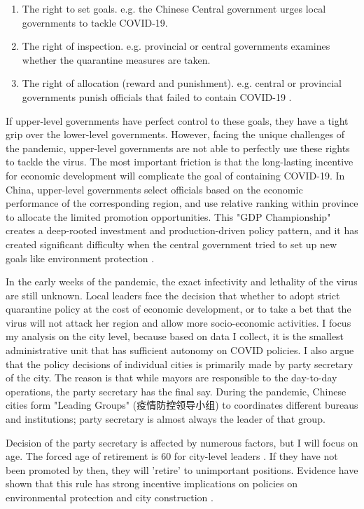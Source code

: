 \documentclass{article}
\begin{document}
\begin{CJK}{UTF8}{gbsn}
\begin{enumerate}
  \item The right to set goals. e.g. the Chinese Central government urges local governments to tackle COVID-19.
  \item The right of inspection. e.g. provincial or central governments examines whether the quarantine measures are taken. 
  \item The right of allocation (reward and punishment). e.g. central or provincial governments punish officials that failed to contain COVID-19 \cite{chezhi}.
\end{enumerate}

If upper-level governments have perfect control to these goals, they have a tight grip over the lower-level governments. 
However, facing the unique challenges of the pandemic, upper-level governments are not able to perfectly use these rights to tackle the virus. The most important friction is that the long-lasting incentive for economic development will complicate the goal of containing COVID-19. In China, upper-level governments select officials based on the  economic performance of the corresponding region, and use relative ranking within province to allocate the limited promotion opportunities. This "GDP Championship" creates a deep-rooted investment and production-driven policy pattern, and it has created significant difficulty when the central government tried to set up new goals like environment protection \cite{gdp contest}. 

In the early weeks of the pandemic, the exact infectivity and lethality of the virus are still unknown. Local leaders face the decision that whether to adopt strict quarantine policy at the cost of economic development, or to take a bet that the virus will not attack her region and allow more socio-economic activities. I focus my analysis on the city level, because based on data I collect, it is the smallest administrative unit that has sufficient autonomy on COVID policies. I also argue that the policy decisions of individual cities is primarily made by party secretary of the city. The reason is that while mayors are responsible to the day-to-day operations, the party secretary has the final say. During the pandemic, Chinese cities form "Leading Groups" (疫情防控领导小组) to coordinates different bureaus and institutions; party secretary is almost always the leader of that group.

Decision of the party secretary is affected by numerous factors, but I will focus on age. The forced age of retirement is 60 for city-level leaders \cite{tuixiu}. If they have not been promoted by then, they will 'retire' to unimportant positions. Evidence have shown that this rule has strong incentive implications on policies on environmental protection and city construction \cite{mayor age effect, mayor age effect2}. 


\end{CJK}
\end{document}
